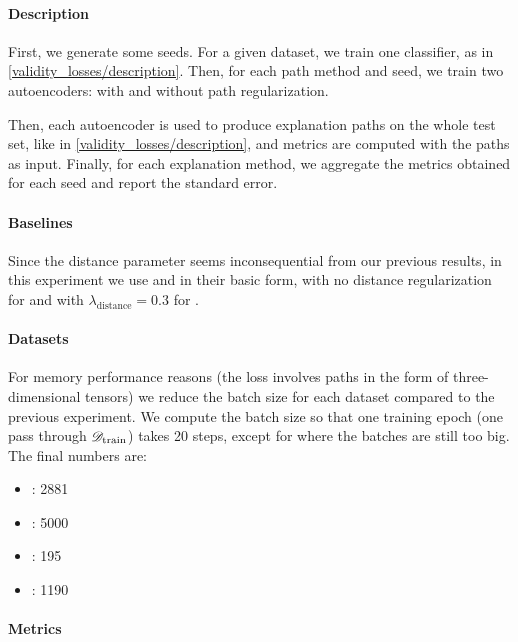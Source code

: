 \documentclass[../main.tex]{subfiles}
\begin{document}
\paragraph{Description}

First, we generate some seeds.
For a given dataset, we train one classifier, as in \autoref{validity_losses/description}.
Then, for each path method and seed, we train two autoencoders: with and without path regularization.

Then, each autoencoder is used to produce explanation paths on the whole test set, like in \autoref{validity_losses/description}, and metrics are computed with the paths as input.
Finally, for each explanation method, we aggregate the metrics obtained for each seed and report the standard error.


\paragraph{Baselines}
\label{exp/path_reg/baselines}

Since the distance parameter seems inconsequential from our previous results,
in this experiment we use \ls{} and \revise{} in their basic form, \ie{} with no distance regularization for \ls{} and with $\lambda_\text{distance} = 0.3$ for \revise.

\paragraph{Datasets}

For memory performance reasons (the loss involves paths in the form of three-dimensional tensors) we reduce the batch size for each dataset compared to the previous experiment.
We compute the batch size so that one training epoch (one pass through $\mathscr{D}_\text{train}$) takes 20 steps, except for \ForestCover{} where the batches are still too big.
The final numbers are:
\begin{itemize}
    \item \CakeOnSea: 2881
    \item \ForestCover: 5000
    \item \WineQuality: 195
    \item \OnlineNewsPopularity: 1190
\end{itemize}

\paragraph{Metrics}
\end{document}
